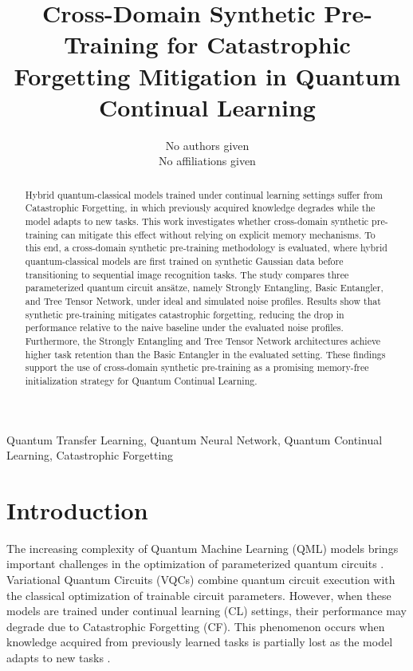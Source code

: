 \documentclass[conference]{IEEEtran}
\begin{document}
\title{Cross-Domain Synthetic Pre-Training for Catastrophic Forgetting Mitigation in Quantum Continual Learning}

\author{No authors given\\No affiliations given}

\maketitle

\begin{abstract}
Hybrid quantum-classical models trained under continual learning settings suffer from Catastrophic Forgetting, in which previously acquired knowledge degrades while the model adapts to new tasks. This work investigates whether cross-domain synthetic pre-training can mitigate this effect without relying on explicit memory mechanisms. To this end, a cross-domain synthetic pre-training methodology is evaluated, where hybrid quantum-classical models are first trained on synthetic Gaussian data before transitioning to sequential image recognition tasks. The study compares three parameterized quantum circuit ans\"atze, namely Strongly Entangling, Basic Entangler, and Tree Tensor Network, under ideal and simulated noise profiles. Results show that synthetic pre-training mitigates catastrophic forgetting, reducing the drop in performance relative to the naive baseline under the evaluated noise profiles. Furthermore, the Strongly Entangling and Tree Tensor Network architectures achieve higher task retention than the Basic Entangler in the evaluated setting. These findings support the use of cross-domain synthetic pre-training as a promising memory-free initialization strategy for Quantum Continual Learning.
\end{abstract}

\begin{IEEEkeywords}
Quantum Transfer Learning, Quantum Neural Network, Quantum Continual Learning, Catastrophic Forgetting
\end{IEEEkeywords}

\section{Introduction}
The increasing complexity of Quantum Machine Learning (QML) \cite{b1} models brings important challenges in the optimization of parameterized quantum circuits \cite{b2}. Variational Quantum Circuits (VQCs) combine quantum circuit execution with the classical optimization of trainable circuit parameters. However, when these models are trained under continual learning (CL) settings, their performance may degrade due to Catastrophic Forgetting (CF). This phenomenon occurs when knowledge acquired from previously learned tasks is partially lost as the model adapts to new tasks \cite{b3}.
\end{document}
